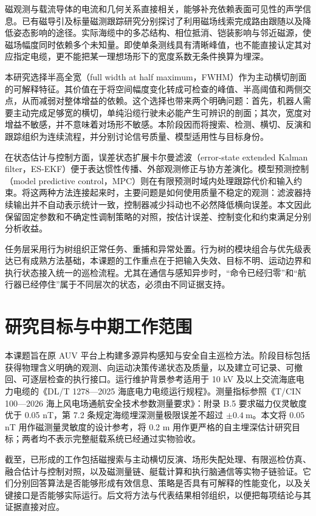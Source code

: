 磁观测与载流导体的电流和几何关系直接相关，能够补充依赖表面可见性的声学信息。已有磁导引及标量磁测跟踪研究分别探讨了利用磁场线索完成路由跟随以及降低姿态影响的途径\cite{xiang2016subsea,li2024attitude}。实际海缆中的多芯结构、相位抵消、铠装影响与邻近磁源，使磁场幅度同时依赖多个未知量。即使单条测线具有清晰峰值，也不能直接认定其对应指定电缆，更不能把某一理想场形下的宽度系数无条件换算为埋深。

本研究选择半高全宽（full width at half maximum，FWHM）作为主动横切剖面的可解释特征。其价值在于将空间幅度变化转成可检查的峰值、半高阈值和两侧交点，从而减弱对整体增益的依赖。这个选择也带来两个明确问题：首先，机器人需要主动完成足够宽的横切，单纯沿缆行驶未必能产生可辨识的剖面；其次，宽度对增益不敏感，并不意味着对场形不敏感。本阶段因而将搜索、检测、横切、反演和跟踪组织为连续流程，并分别讨论信号质量、模型适用性与目标身份。

在状态估计与控制方面，误差状态扩展卡尔曼滤波（error-state extended Kalman filter，ES-EKF）便于表达惯性传播、外部观测修正与协方差演化\cite{sola2017quaternion}。模型预测控制（model predictive control，MPC）则在有限预测时域内处理跟踪代价和输入约束\cite{mayne2000constrained}。将这两种方法连接起来时，主要问题是如何使用质量不稳定的观测：滤波器持续输出并不自动表示统计一致，控制器减少抖动也不必然降低横向误差。本文因此保留固定参数和不确定性调制策略的对照，按估计误差、控制变化和约束满足分别分析收益。

任务层采用行为树组织正常任务、重捕和异常处置。行为树的模块组合与优先级表达已有成熟方法基础\cite{colledanchise2018behavior}，本课题的工作重点在于把输入失效、目标不明、运动边界和执行状态接入统一的巡检流程。尤其在通信与感知异步时，“命令已经归零”和“航行器已经停住”属于不同层次的状态，必须由不同证据支持。

\section{研究目标与中期工作范围}

本课题旨在原 AUV 平台上构建多源异构感知与安全自主巡检方法。阶段目标包括获得物理含义明确的观测、向运动决策传递状态及质量，以及建立可记录、可撤回、可逐层检查的执行接口。运行维护背景参考适用于 10 kV 及以上交流海底电力电缆的《DL/T 1278---2025 海底电力电缆运行规程》\cite{dlt1278_2025}。测量指标参照《T/CIN 100---2026 海上风电场通航安全技术参数测量要求》\cite{tcin100_2026}：附录 B.5 要求磁力仪灵敏度优于 0.05 nT，第 7.2 条规定海缆埋深测量极限误差不超过 $\pm0.4~\mathrm{m}$。本文将 0.05 nT 用作磁测量灵敏度的设计参考，将 0.2 m 用作更严格的自主埋深估计研究目标；两者均不表示完整艇载系统已经通过实物验收。

截至\ReportCutoff，已形成的工作包括磁搜索与主动横切反演、场形失配处理、有限巡检仿真、融合估计与控制对照，以及磁测量链、艇载计算和执行脑通信等实物子链验证。它们分别回答算法是否能够形成有效信息、策略是否具有可解释的性能变化，以及关键接口是否能够实际运行。后文将方法与代表结果相邻组织，以便把每项结论与其证据直接对应。
